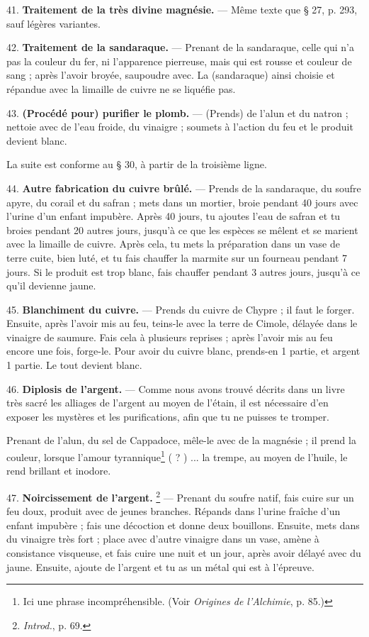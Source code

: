 \documentclass[a4paper, 11pt, oneside, polutonikogreek, french]{article}
\begin{document}
41. \textbf{Traitement de la très divine magnésie.} --- Même texte que § 27, p. 293, sauf légères variantes.

42. \textbf{Traitement de la sandaraque.} --- Prenant de la sandaraque, celle qui n'a pas la couleur du fer, ni l'apparence pierreuse, mais qui est rousse et couleur de sang ; après l'avoir broyée, saupoudre avec. La (sandaraque) ainsi choisie et répandue avec la limaille de cuivre ne se liquéfie pas.

43. \textbf{(Procédé pour) purifier le plomb.} --- (Prends) de l'alun et du natron ; nettoie avec de l'eau froide, du vinaigre ; soumets à l'action du feu et le produit devient blanc.

La suite est conforme au § 30, à partir de la troisième ligne.

44. \textbf{Autre fabrication du cuivre brûlé.} --- Prends de la sandaraque, du soufre apyre, du corail et du safran ; mets dans un mortier, broie pendant 40 jours avec l'urine d'un enfant impubère. Après 40 jours, tu ajoutes l'eau de safran et tu broies pendant 20 autres jours, jusqu'à ce que les espèces se mêlent et se marient avec la limaille de cuivre. Après cela, tu mets la préparation dans un vase de terre cuite, bien luté, et tu fais chauffer la marmite sur un fourneau pendant 7 jours. Si le produit est trop blanc, fais chauffer pendant 3 autres jours, jusqu'à ce qu'il devienne jaune.

45. \textbf{Blanchiment du cuivre.} --- Prends du cuivre de Chypre ; il faut le forger. Ensuite, après l'avoir mis au feu, teins-le avec la terre de Cimole, délayée dans le vinaigre de saumure. Fais cela à plusieurs reprises ; après l'avoir mis au feu encore une fois, forge-le. Pour avoir du cuivre blanc, prends-en 1 partie, et argent 1 partie. Le tout devient blanc.

46. \textbf{Diplosis de l'argent.} --- Comme nous avons trouvé décrits dans un livre très sacré les alliages de l'argent au moyen de l'étain, il est nécessaire d'en exposer les mystères et les purifications, afin que tu ne puisses te tromper.

Prenant de l'alun, du sel de Cappadoce, mêle-le avec de la magnésie ; il prend la couleur, lorsque l'amour tyrannique\footnote{Ici une phrase incompréhensible. (Voir \emph{Origines de l'Alchimie}, p. 85.)} ( ? ) ... la trempe, au moyen de l'huile, le rend brillant et inodore.

47. \textbf{Noircissement de l'argent.} \footnote{\emph{Introd.}, p. 69.} --- Prenant du soufre natif, fais cuire sur un feu doux, produit avec de jeunes branches. Répands dans l'urine fraîche d'un enfant impubère ; fais une décoction et donne deux bouillons. Ensuite, mets dans du vinaigre très fort ; place avec d'autre vinaigre dans un vase, amène à consistance visqueuse, et fais cuire une nuit et un jour, après avoir délayé avec du jaune. Ensuite, ajoute de l'argent et tu as un métal qui est à l'épreuve.
\end{document}
